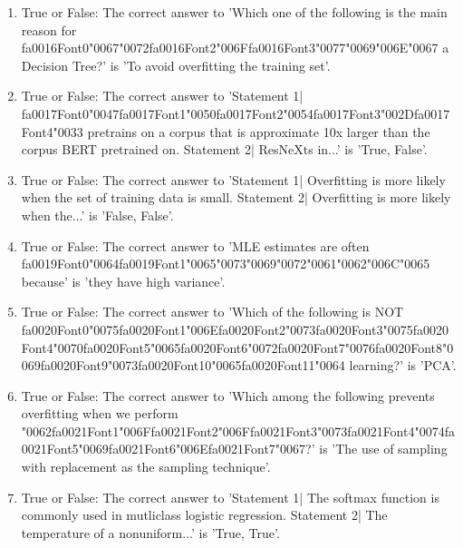 \documentclass[12pt]{article}
\begin{document}
\begin{enumerate}[label=\arabic*.]
\item True or False: The correct answer to 'Which one of the following is the main reason for {\csname fa0016Font0\endcsname\char"0067}{\char"0072}{\csname fa0016Font2\endcsname\char"006F}{\csname fa0016Font3\endcsname\char"0077}{\char"0069}{\char"006E}{\char"0067} a Decision Tree?' is 'To avoid overfitting the training set'.
\item True or False: The correct answer to 'Statement 1| {\csname fa0017Font0\endcsname\char"0047}{\csname fa0017Font1\endcsname\char"0050}{\csname fa0017Font2\endcsname\char"0054}{\csname fa0017Font3\endcsname\char"002D}{\csname fa0017Font4\endcsname\char"0033} pretrains on a corpus that is approximate 10x larger than the corpus BERT pretrained on. Statement 2| ResNeXts in...' is 'True, False'.
\item True or False: The correct answer to 'Statement 1| Overfitting is more likely when the set of training data is small. Statement 2| Overfitting is more likely when the...' is 'False, False'.
\item True or False: The correct answer to 'MLE estimates are often {\csname fa0019Font0\endcsname\char"0064}{\csname fa0019Font1\endcsname\char"0065}{\char"0073}{\char"0069}{\char"0072}{\char"0061}{\char"0062}{\char"006C}{\char"0065} because' is 'they have high variance'.
\item True or False: The correct answer to 'Which of the following is NOT {\csname fa0020Font0\endcsname\char"0075}{\csname fa0020Font1\endcsname\char"006E}{\csname fa0020Font2\endcsname\char"0073}{\csname fa0020Font3\endcsname\char"0075}{\csname fa0020Font4\endcsname\char"0070}{\csname fa0020Font5\endcsname\char"0065}{\csname fa0020Font6\endcsname\char"0072}{\csname fa0020Font7\endcsname\char"0076}{\csname fa0020Font8\endcsname\char"0069}{\csname fa0020Font9\endcsname\char"0073}{\csname fa0020Font10\endcsname\char"0065}{\csname fa0020Font11\endcsname\char"0064} learning?' is 'PCA'.
\item True or False: The correct answer to 'Which among the following prevents overfitting when we perform {\char"0062}{\csname fa0021Font1\endcsname\char"006F}{\csname fa0021Font2\endcsname\char"006F}{\csname fa0021Font3\endcsname\char"0073}{\csname fa0021Font4\endcsname\char"0074}{\csname fa0021Font5\endcsname\char"0069}{\csname fa0021Font6\endcsname\char"006E}{\csname fa0021Font7\endcsname\char"0067}?' is 'The use of sampling with replacement as the sampling technique'.
\item True or False: The correct answer to 'Statement 1| The softmax function is commonly used in mutliclass logistic regression. Statement 2| The temperature of a nonuniform...' is 'True, True'.

\end{enumerate}
\end{document}

